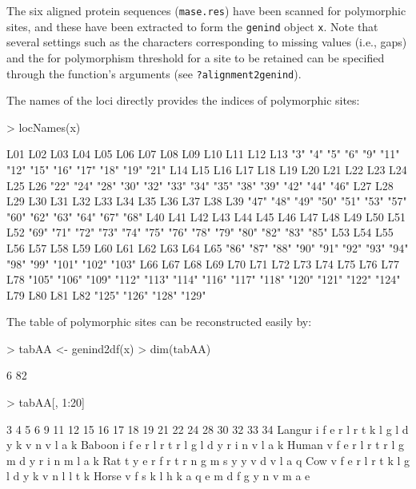 \documentclass{article}
\begin{document}
The six aligned protein sequences (\texttt{mase.res}) have been scanned for polymorphic sites, and
these have been extracted to form the \texttt{genind} object \texttt{x}.
Note that several settings such as the characters corresponding to missing values (i.e., gaps) and
the for polymorphism threshold for a site to be retained can be specified through the function's
arguments (see \texttt{?alignment2genind}).

The names of the loci directly provides the indices of polymorphic sites:
\begin{Schunk}
\begin{Sinput}
> locNames(x)
\end{Sinput}
\begin{Soutput}
  L01   L02   L03   L04   L05   L06   L07   L08   L09   L10   L11   L12   L13 
  "3"   "4"   "5"   "6"   "9"  "11"  "12"  "15"  "16"  "17"  "18"  "19"  "21" 
  L14   L15   L16   L17   L18   L19   L20   L21   L22   L23   L24   L25   L26 
 "22"  "24"  "28"  "30"  "32"  "33"  "34"  "35"  "38"  "39"  "42"  "44"  "46" 
  L27   L28   L29   L30   L31   L32   L33   L34   L35   L36   L37   L38   L39 
 "47"  "48"  "49"  "50"  "51"  "53"  "57"  "60"  "62"  "63"  "64"  "67"  "68" 
  L40   L41   L42   L43   L44   L45   L46   L47   L48   L49   L50   L51   L52 
 "69"  "71"  "72"  "73"  "74"  "75"  "76"  "78"  "79"  "80"  "82"  "83"  "85" 
  L53   L54   L55   L56   L57   L58   L59   L60   L61   L62   L63   L64   L65 
 "86"  "87"  "88"  "90"  "91"  "92"  "93"  "94"  "98"  "99" "101" "102" "103" 
  L66   L67   L68   L69   L70   L71   L72   L73   L74   L75   L76   L77   L78 
"105" "106" "109" "112" "113" "114" "116" "117" "118" "120" "121" "122" "124" 
  L79   L80   L81   L82 
"125" "126" "128" "129" 
\end{Soutput}
\end{Schunk}
The table of polymorphic sites can be reconstructed easily by:
\begin{Schunk}
\begin{Sinput}
> tabAA <- genind2df(x)
> dim(tabAA)
\end{Sinput}
\begin{Soutput}
[1]  6 82
\end{Soutput}
\begin{Sinput}
> tabAA[, 1:20]
\end{Sinput}
\begin{Soutput}
       3 4 5 6 9 11 12 15 16 17 18 19 21 22 24 28 30 32 33 34
Langur i f e r l  r  t  k  l  g  l  d  y  k  v  n  v  l  a  k
Baboon i f e r l  r  t  r  l  g  l  d  y  r  i  n  v  l  a  k
Human  v f e r l  r  t  r  l  g  m  d  y  r  i  n  m  l  a  k
Rat    t y e r f  r  t  r  n  g  m  s  y  y  v  d  v  l  a  q
Cow    v f e r l  r  t  k  l  g  l  d  y  k  v  n  l  l  t  k
Horse  v f s k l  h  k  a  q  e  m  d  f  g  y  n  v  m  a  e
\end{Soutput}
\end{Schunk}
\end{document}

